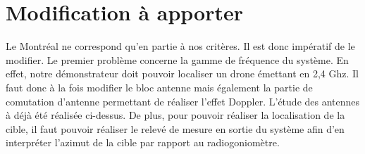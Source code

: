 \section{Modification à apporter}

	Le Montréal ne correspond qu'en partie à nos critères. Il est donc impératif de le modifier.
	Le premier problème concerne la gamme de fréquence du système. En effet, notre démonstrateur doit pouvoir localiser un drone émettant en 2,4 Ghz. Il faut donc à la fois modifier le bloc antenne mais également la partie de comutation d'antenne permettant de réaliser l'effet Doppler. L'étude des antennes à déjà été réalisée ci-dessus.
	De plus, pour pouvoir réaliser la localisation de la cible, il faut pouvoir réaliser le relevé de mesure en sortie du système afin d'en interpréter l'azimut de la cible par rapport au radiogoniomètre.

